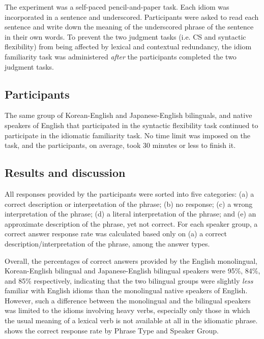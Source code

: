 The experiment was a self-paced pencil-and-paper task. Each idiom was incorporated in a sentence and underscored. Participants were asked to read each sentence and write down the meaning of the underscored phrase of the sentence in their own words. To prevent the two judgment tasks (i.e. \ac{CS} and syntactic flexibility) from being affected by lexical and contextual redundancy, the idiom familiarity task was administered \textit{after} the participants completed the two judgment tasks. 

\subsection{Participants}\label{ch2:sect:2.3.3}

The same group of Korean-English and Japanese-English bilinguals, and native speakers of English that participated in the syntactic flexibility task continued to participate in the idiomatic familiarity task. No time limit was imposed on the task, and the participants, on average, took 30 minutes or less to finish it.

\subsection{Results and discussion}\label{ch2:sect:2.3.4}

All responses provided by the participants were sorted into five categories: (a) a correct description or interpretation of the phrase; (b) no response; (c) a wrong interpretation of the phrase; (d) a literal interpretation of the phrase; and (e) an approximate description of the phrase, yet not correct. For each speaker group, a correct answer response rate was calculated based only on (a) a correct description/interpretation of the phrase, among the answer types. 

Overall, the percentages of correct answers provided by the English monolingual, Korean-English bilingual and Japanese-English bilingual speakers were 95\%, 84\%, and 85\% respectively, indicating that the two bilingual groups were slightly \emph{less} familiar with English idioms than the monolingual native speakers of English. However, such a difference between the monolingual and the bilingual speakers was limited to the idioms involving heavy verbs, especially only those in which the usual meaning of a lexical verb is not available at all in the idiomatic phrase.  shows the correct response rate by Phrase Type and Speaker Group. 

